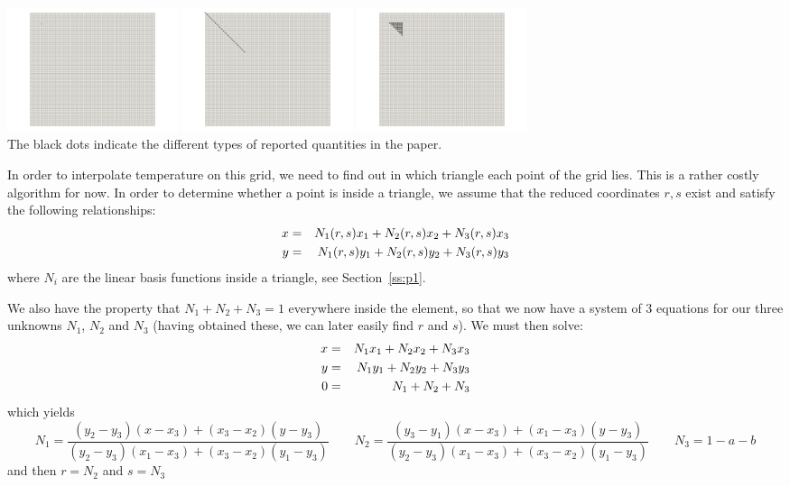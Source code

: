 \begin{center}
\includegraphics[width=5cm]{python_codes/fieldstone_68/images/grid3}
\includegraphics[width=5cm]{python_codes/fieldstone_68/images/grid4}
\includegraphics[width=5cm]{python_codes/fieldstone_68/images/grid5}\\
{\captionfont The black dots indicate the different types of reported quantities in the paper.}
\end{center}

In order to interpolate temperature on this grid, we need to find out in which 
triangle each point of the grid lies. This is a rather costly algorithm for now. 
In order to determine whether a point is inside a triangle, we assume that 
the reduced coordinates $r,s$ exist and satisfy the following 
relationships:
\begin{eqnarray}
x &=& N_1(r,s) x_1 + N_2(r,s) x_2 + N_3(r,s) x_3 \nonumber\\  
y &=& N_1(r,s) y_1 + N_2(r,s) y_2 + N_3(r,s) y_3 \nonumber
\end{eqnarray}
where $N_i$ are the linear basis functions inside a triangle, see Section~\ref{ss:p1}.

We also have the property that $N_1+N_2+N_3=1$ everywhere inside the element, so that 
we now have a system of 3 equations for our three unknowns $N_1$, $N_2$ and $N_3$ (having
obtained these, we can later easily find $r$ and $s$).
We must then solve:
\begin{eqnarray}
x &=& N_1 x_1 + N_2 x_2 + N_3 x_3 \nonumber\\  
y &=& N_1 y_1 + N_2 y_2 + N_3 y_3 \nonumber\\
0 &=& N_1+N_2+N_3 \nonumber
\end{eqnarray}
which yields
\[
N_1=\frac{(y_2 - y_3)(x - x_3) + (x_3 - x_2)(y - y_3)}{(y_2 - y_3)(x_1 - x_3) + (x_3 - x_2)(y_1 - y_3)}
\qquad
N_2=\frac{(y_3 - y_1)(x - x_3) + (x_1 - x_3)(y - y_3)}{(y_2 - y_3)(x_1 - x_3) + (x_3 - x_2)(y_1 - y_3)}
\qquad
N_3=1-a-b
\]
and then $r=N_2$ and $s=N_3$


